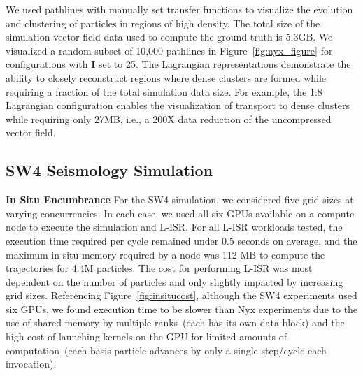 We used pathlines with manually set transfer functions to visualize the evolution and clustering of particles in regions of high density.
%
The total size of the simulation vector field data used to compute the ground truth is 5.3GB.
%
We visualized a random subset of 10,000 pathlines in Figure~\ref{fig:nyx_figure} for configurations with \textbf{I} set to 25.
%
%
%
%
The Lagrangian representations demonstrate the ability to closely reconstruct regions where dense clusters are formed while requiring a fraction of the total simulation data size.
%
For example, the 1:8 Lagrangian configuration enables the visualization of transport to dense clusters while requiring only 27MB, i.e., a 200X data reduction of the uncompressed vector field.
%

\vspace{-1mm}
\subsection{SW4 Seismology Simulation}
\label{sec:sw4}
\noindent\textbf{In Situ Encumbrance}
For the SW4 simulation, we considered five grid sizes at varying concurrencies.
%
In each case, we used all six GPUs available on a compute node to execute the simulation and L-ISR.
%
For all L-ISR workloads tested, the execution time required per cycle remained under 0.5 seconds on average, and the maximum in situ memory required by a node was 112 MB to compute the trajectories for 4.4M particles.
%
The cost for performing L-ISR was most dependent on the number of particles and only slightly impacted by increasing grid sizes.
%
%
Referencing Figure~\ref{fig:insitucost}, although the SW4 experiments used six GPUs, we found execution time to be slower than Nyx experiments due to the use of shared memory by multiple ranks~(each has its own data block) and the high cost of launching kernels on the GPU for limited amounts of computation~(each basis particle advances by only a single step/cycle each invocation). 
%
%
%
%
%
%


